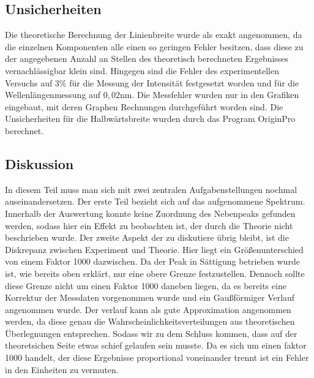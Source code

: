 \documentclass[
	a4paper,
	12pt,
	pagesize,
	ngerman
]{scrartcl}
\begin{document}
\subsection{Unsicherheiten}
Die theoretische Berechnung der Linienbreite wurde als exakt angenommen, da die einzelnen Komponenten alle einen so geringen Fehler besitzen, dass diese zu der angegebenen Anzahl an Stellen des theoretisch berechneten Ergebnisses vernachlässigbar klein sind.
Hingegen sind die Fehler des experimentellen Versuchs auf 3\% für die Messung der Intensität festgesetzt worden und für die Wellenlängenmessung auf
$0,02$nm. Die Messfehler wurden nur in den Grafiken eingebaut, mit deren Graphen Rechnungen durchgeführt worden sind. Die Unsicherheiten für die Halbwärtsbreite wurden durch das Program OriginPro berechnet. 


\subsection{Diskussion}
In diesem Teil muss man sich mit zwei zentralen Aufgabenstellungen nochmal auseinandersetzen. Der erste Teil bezieht sich auf das aufgenommene Spektrum. 
Innerhalb der Auswertung konnte keine Zuordnung des Nebenpeaks gefunden werden, sodass hier ein Effekt zu beobachten ist, der durch die Theorie nicht beschrieben wurde. 
Der zweite Aspekt der zu diskutiere übrig bleibt, ist die Diskrepanz zwischen Experiment und Theorie. Hier liegt ein Größenunterschied von einem Faktor 1000 dazwischen. Da der Peak in Sättigung betrieben wurde ist, wie bereits oben erklärt, nur eine obere Grenze festzustellen. Dennoch sollte diese Grenze nicht um einen Faktor 1000 daneben liegen, da es bereits eine Korrektur der Messdaten vorgenommen wurde und ein Gaußförmiger Verlauf angenommen wurde. Der verlauf kann als gute Approximation angenommen werden, da diese genau die Wahrscheinlichkeitsverteilungen aus theoretischen Überlegnungen entsprechen. Sodass wir zu dem Schluss kommen, dass auf der theoretsichen Seite etwas schief gelaufen sein musste. Da es sich um einen faktor 1000 handelt, der diese Ergebnisse proportional voneinander trennt ist ein Fehler in den Einheiten zu vermuten.
\end{document}

